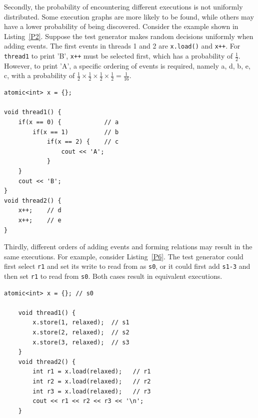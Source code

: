



Secondly, the probability of encountering different executions is not uniformly distributed. Some execution graphs are more likely to be found, while others may have a lower probability of being discovered. Consider the example shown in Listing~\ref{P2}. Suppose the test generator makes random decisions uniformly when adding events. The first events in threads 1 and 2 are \texttt{x.load()} and \texttt{x++}. For \texttt{thread1} to print 'B', \texttt{x++} must be selected first, which has a probability of $\frac{1}{2}$. However, to print 'A', a specific ordering of events is required, namely {a, d, b, e, c}, with a probability of $\frac{1}{2} \times \frac{1}{2} \times \frac{1}{2} \times \frac{1}{2} = \frac{1}{16}$.
\begin{lstlisting}[caption={P2}, label={P2}]
atomic<int> x = {};

void thread1() {
    if(x == 0) {            // a
        if(x == 1)          // b
            if(x == 2) {    // c 
                cout << 'A';
            }
    }
    cout << 'B';
}
void thread2() {
    x++;    // d
    x++;    // e
}
\end{lstlisting}


Thirdly, different orders of adding events and forming relations may result in the same executions. For example, consider Listing~\ref{P6}. The test generator could first select \texttt{r1} and set its write to read from as \texttt{s0}, or it could first add \texttt{s1-3} and then set \texttt{r1} to read from \texttt{s0}. Both cases result in equivalent executions.

\begin{lstlisting}[caption={P6}, label={P6}]
    atomic<int> x = {}; // s0
    
    void thread1() {
        x.store(1, relaxed);  // s1 
        x.store(2, relaxed);  // s2 
        x.store(3, relaxed);  // s3 
    }
    void thread2() {
        int r1 = x.load(relaxed);   // r1
        int r2 = x.load(relaxed);   // r2 
        int r3 = x.load(relaxed);   // r3 
        cout << r1 << r2 << r3 << '\n';
    }
\end{lstlisting}




